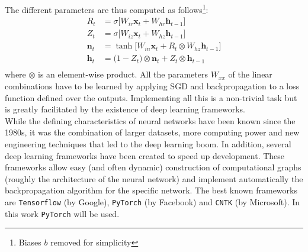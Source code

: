 The different parameters are thus computed as follows\footnote{Biases $b$ removed for simplicity}:
\begin{align*}
        R_t &= \sigma\Big [ W_{ir} \bm{x}_t + W_{hr} \bm{h}_{t-1} \Big ] \\
        Z_t &= \sigma \Big [ W_{iz} \bm{x}_t + W_{hz} \bm{h}_{t-1} \Big ] \\
        \bm{n}_t &= \tanh \Big [ W_{in} \bm{x}_t + R_t \otimes W_{hz} \bm{h}_{t-1} \Big ] \\
        \bm{h}_t &= \big ( 1-Z_t \big ) \otimes \bm{n}_t + Z_t \otimes \bm{h}_{t-1} \\
\end{align*}
where $\otimes$ is an element-wise product. All the parameters $W_{xx}$ of the linear combinations have to be learned by applying SGD and backpropagation to a loss function defined over the outputs. Implementing all this is a non-trivial task but is greatly facilitated by the existence of deep learning frameworks.\\
While the defining characteristics of neural networks have been known since the 1980s, it was the combination of larger datasets, more computing power and new engineering techniques that led to the deep learning boom. In addition, several deep learning frameworks have been created to speed up development. These frameworks allow easy (and often dynamic) construction of computational graphs (roughly the architecture of the neural network) and implement automatically the backpropagation algorithm for the specific network. The best known frameworks are {\tt Tensorflow} (by Google), {\tt PyTorch} (by Facebook) and {\tt CNTK} (by Microsoft). In this work {\tt PyTorch} will be used.

